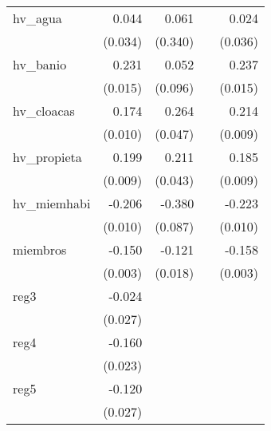 {\begin{longtable}{l*{4}{D{.}{.}{-1}}}
\addlinespace
hv\_agua     &       0.044         &       0.061         &                     &       0.024         \\
            &     (0.034)         &     (0.340)         &                     &     (0.036)         \\
\addlinespace
hv\_banio    &       0.231\sym{***}&       0.052         &                     &       0.237\sym{***}\\
            &     (0.015)         &     (0.096)         &                     &     (0.015)         \\
\addlinespace
hv\_cloacas  &       0.174\sym{***}&       0.264\sym{***}&                     &       0.214\sym{***}\\
            &     (0.010)         &     (0.047)         &                     &     (0.009)         \\
\addlinespace
hv\_propieta &       0.199\sym{***}&       0.211\sym{***}&                     &       0.185\sym{***}\\
            &     (0.009)         &     (0.043)         &                     &     (0.009)         \\
\addlinespace
hv\_miemhabi &      -0.206\sym{***}&      -0.380\sym{***}&                     &      -0.223\sym{***}\\
            &     (0.010)         &     (0.087)         &                     &     (0.010)         \\
\addlinespace
miembros    &      -0.150\sym{***}&      -0.121\sym{***}&                     &      -0.158\sym{***}\\
            &     (0.003)         &     (0.018)         &                     &     (0.003)         \\
\addlinespace
reg3        &      -0.024         &                     &                     &                     \\
            &     (0.027)         &                     &                     &                     \\
\addlinespace
reg4        &      -0.160\sym{***}&                     &                     &                     \\
            &     (0.023)         &                     &                     &                     \\
\addlinespace
reg5        &      -0.120\sym{***}&                     &                     &                     \\
            &     (0.027)         &                     &                     &                     \\

\end{longtable}}
